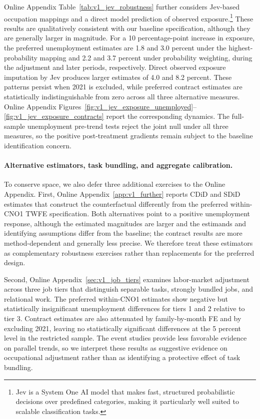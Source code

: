 \documentclass[11pt]{article}
\begin{document}
Online Appendix Table~\ref{tab:v1_jev_robustness} further considers Jev-based occupation mappings and a direct model prediction of observed exposure.\footnote{Jev is a System One AI model that makes fast, structured probabilistic decisions over predefined categories, making it particularly well suited to scalable classification tasks.} These results are qualitatively consistent with our baseline specification, although they are generally larger in magnitude. For a 10 percentage-point increase in exposure, the preferred unemployment estimates are 1.8 and 3.0 percent under the highest-probability mapping and 2.2 and 3.7 percent under probability weighting, during the adjustment and later periods, respectively. Direct observed exposure imputation by Jev produces larger estimates of 4.0 and 8.2 percent. These patterns persist when 2021 is excluded, while preferred contract estimates are statistically indistinguishable from zero across all three alternative measures. Online Appendix Figures~\ref{fig:v1_jev_exposure_unemployed}--\ref{fig:v1_jev_exposure_contracts} report the corresponding dynamics. The full-sample unemployment pre-trend tests reject the joint null under all three measures, so the positive post-treatment gradients remain subject to the baseline identification concern.

\FloatBarrier
\paragraph{Alternative estimators, task bundling, and aggregate calibration.} To conserve space, we also defer three additional exercises to the Online Appendix. First, Online Appendix~\ref{app:v1_further} reports CDiD and SDiD estimates that construct the counterfactual differently from the preferred within-CNO1 TWFE specification. Both alternatives point to a positive unemployment response, although the estimated magnitudes are larger and the estimands and identifying assumptions differ from the baseline; the contract results are more method-dependent and generally less precise. We therefore treat these estimators as complementary robustness exercises rather than replacements for the preferred design.

Second, Online Appendix~\ref{sec:v1_job_tiers} examines labor-market adjustment across three job tiers that distinguish separable tasks, strongly bundled jobs, and relational work. The preferred within-CNO1 estimates show negative but statistically insignificant unemployment differences for tiers 1 and 2 relative to tier 3. Contract estimates are also attenuated by family-by-month FE and by excluding 2021, leaving no statistically significant differences at the 5 percent level in the restricted sample. The event studies provide less favorable evidence on parallel trends, so we interpret these results as suggestive evidence on occupational adjustment rather than as identifying a protective effect of task bundling.
\end{document}
